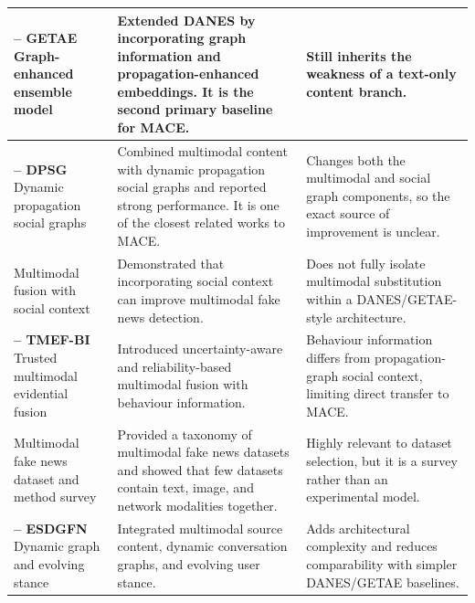{\begin{longtable}{
>{\raggedright\arraybackslash}p{}
>{\raggedright\arraybackslash}p{}
>{\raggedright\arraybackslash}p{}
}
\textbf{\citet{GETAE2025} -- GETAE} \newline
Graph-enhanced ensemble model
&
Extended DANES by incorporating graph information and propagation-enhanced embeddings. It is the second primary baseline for MACE.
&
Still inherits the weakness of a text-only content branch. \\

\midrule

\textbf{\citet{jing2025} -- DPSG} \newline
Dynamic propagation social graphs
&
Combined multimodal content with dynamic propagation social graphs and reported strong performance. It is one of the closest related works to MACE.
&
Changes both the multimodal and social graph components, so the exact source of improvement is unclear. \\

\midrule

\textbf{\citet{Dellys2025}} \newline
Multimodal fusion with social context
&
Demonstrated that incorporating social context can improve multimodal fake news detection.
&
Does not fully isolate multimodal substitution within a DANES/GETAE-style architecture. \\

\midrule

\textbf{\citet{Chen2025} -- TMEF-BI} \newline
Trusted multimodal evidential fusion
&
Introduced uncertainty-aware and reliability-based multimodal fusion with behaviour information.
&
Behaviour information differs from propagation-graph social context, limiting direct transfer to MACE. \\

\midrule

\textbf{\citet{lv2025multimodal}} \newline
Multimodal fake news dataset and method survey
&
Provided a taxonomy of multimodal fake news datasets and showed that few datasets contain text, image, and network modalities together.
&
Highly relevant to dataset selection, but it is a survey rather than an experimental model. \\

\midrule

\textbf{\citet{Sun25} -- ESDGFN} \newline
Dynamic graph and evolving stance
&
Integrated multimodal source content, dynamic conversation graphs, and evolving user stance.
&
Adds architectural complexity and reduces comparability with simpler DANES/GETAE baselines. \\


\end{longtable}}
